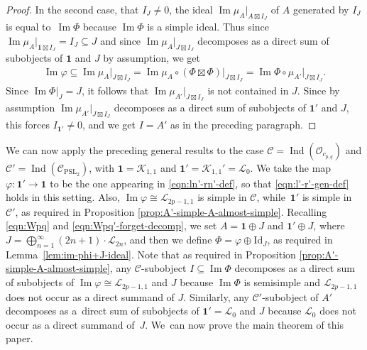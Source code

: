 \documentclass[pdftex]{sigma}
\numberwithin{equation}{section}
\theoremstyle{definition}
\begin{document}
\begin{proof}
In the second case, that $I_J\neq 0$, the ideal $\operatorname{Im} \mu_A\vert_{A\boxtimes I_J}$ of $A$ generated by $I_J$ is equal to~$\operatorname{Im} \Phi$ because $\operatorname{Im} \Phi$ is a simple ideal. Thus since $\operatorname{Im} \mu_A\vert_{\mathbf{1}\boxtimes I_J}=I_J\subseteq J$ and since $\operatorname{Im} \mu_A\vert_{J\boxtimes I_J}$ decomposes as a direct sum of subobjects of $\mathbf{1}$ and $J$ by assumption, we get
\begin{gather*}
\operatorname{Im} \varphi\subseteq\operatorname{Im} \mu_A\vert_{J\boxtimes I_J}=\operatorname{Im} \mu_A\circ(\Phi\boxtimes\Phi)\vert_{J\boxtimes I_J} =\operatorname{Im} \Phi\circ\mu_{A'}\vert_{J\boxtimes I_J}.
\end{gather*}
Since $\operatorname{Im} \Phi\vert_J =J$, it follows that $\operatorname{Im} \mu_{A'}\vert_{J\boxtimes I_J}$ is not contained in $J$. Since by assumption $\operatorname{Im} \mu_{A'}\vert_{J\boxtimes I_J}$ decomposes as a direct sum of subobjects of $\mathbf{1}'$ and $J$, this forces $I_{\mathbf{1}'}\neq 0$, and we get $I=A'$ as in the preceding paragraph.
\end{proof}

We can now apply the preceding general results to the case $\mathcal{C}=\operatorname{Ind}(\mathcal{O}_{c_{p,q}})$ and $\mathcal{C}'=\operatorname{Ind}(\mathcal{C}_{\mathrm{PSL}_2})$, with $\mathbf{1}=\mathcal{K}_{1,1}$ and $\mathbf{1}'=\mathcal{K}_{1,1}'=\mathcal{L}_0$. We take the map $\varphi\colon \mathbf{1}'\rightarrow\mathbf{1}$ to be the one appearing in \eqref{eqn:ln'-rn'-def}, so that \eqref{eqn:l'-r'-gen-def} holds in this setting.
Also, $\operatorname{Im} \varphi\cong\mathcal{L}_{2p-1,1}$ is simple in $\mathcal{C}$, while~$\mathbf{1}'$ is simple in $\mathcal{C}'$, as required in Proposition \ref{prop:A'-simple-A-almost-simple}.
Recalling \eqref{eqn:Wpq} and \eqref{eqn:Wpq'-forget-decomp}, we set $A=\mathbf{1}\oplus J$ and $\mathbf{1}'\oplus J$, where $J=\bigoplus_{n=1}^\infty (2n+1)\cdot\mathcal{L}_{2n}$, and then we define $\Phi=\varphi\oplus\mathrm{Id}_J$, as required in Lemma~\ref{lem:im-phi+J-ideal}. Note that as required in Proposition \ref{prop:A'-simple-A-almost-simple}, any $\mathcal{C}$-subobject $I\subseteq\operatorname{Im} \Phi$ decomposes as a direct sum of subobjects of $\operatorname{Im} \varphi\cong\mathcal{L}_{2p-1,1}$ and $J$ because $\operatorname{Im} \Phi$ is semisimple and $\mathcal{L}_{2p-1,1}$ does not occur as a direct summand of $J$. Similarly, any $\mathcal{C}'$-subobject of $A'$ decomposes as a~direct sum of subobjects of $\mathbf{1}'=\mathcal{L}_0$ and $J$ because $\mathcal{L}_0$ does not occur as a direct summand of~$J$.
We~can now prove the main theorem of this paper.
\end{document}
